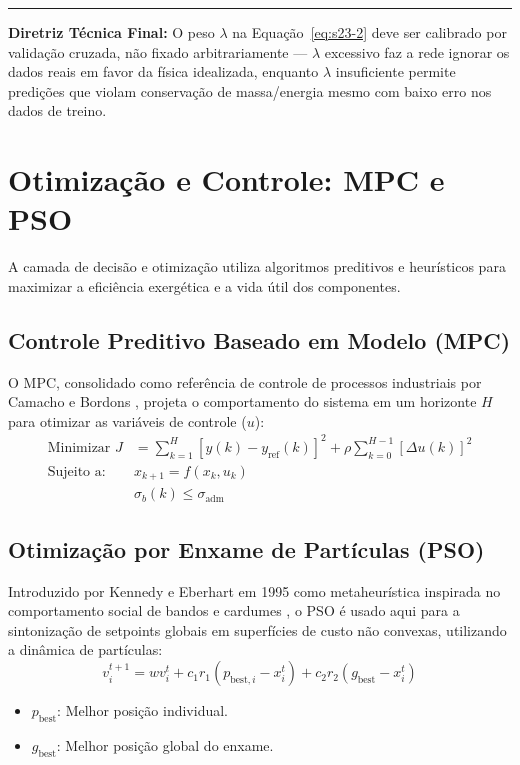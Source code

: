 \documentclass[12pt,a4paper]{article}
\numberwithin{equation}{section}
\numberwithin{table}{section}
\numberwithin{figure}{section}
\begin{document}
	\vspace{1em}
	\hrule
	\vspace{1em}

	\textbf{Diretriz Técnica Final:} O peso $\lambda$ na Equação~\eqref{eq:s23-2} deve ser calibrado por validação cruzada, não fixado arbitrariamente — $\lambda$ excessivo faz a rede ignorar os dados reais em favor da física idealizada, enquanto $\lambda$ insuficiente permite predições que violam conservação de massa/energia mesmo com baixo erro nos dados de treino.

	\section{Otimização e Controle: MPC e PSO}
	
	A camada de decisão e otimização utiliza algoritmos preditivos e heurísticos para maximizar a eficiência exergética e a vida útil dos componentes.
	
	\subsection{Controle Preditivo Baseado em Modelo (MPC)}
	O MPC, consolidado como referência de controle de processos industriais por Camacho e Bordons \cite{mpc}, projeta o comportamento do sistema em um horizonte $H$ para otimizar as variáveis de controle ($u$):
	\begin{equation}\label{eq:s24-1}
	\begin{aligned}
		\text{Minimizar } J &= \sum_{k=1}^{H} [ y(k) - y_{\text{ref}}(k) ]^2 + \rho \sum_{k=0}^{H-1} [ \Delta u(k) ]^2 \\[4pt]
		\text{Sujeito a: } & x_{k+1} = f(x_k, u_k) \\
		& \sigma_b(k) \le \sigma_{\text{adm}}
	\end{aligned}
\end{equation}
	
	\subsection{Otimização por Enxame de Partículas (PSO)}
	Introduzido por Kennedy e Eberhart em 1995 como metaheurística inspirada no comportamento social de bandos e cardumes \cite{pso}, o PSO é usado aqui para a sintonização de setpoints globais em superfícies de custo não convexas, utilizando a dinâmica de partículas:
	\begin{equation}\label{eq:s24-2}
 v_{i}^{t+1} = w v_{i}^t + c_1 r_1 (p_{\text{best},i} - x_{i}^t) + c_2 r_2 (g_{\text{best}} - x_{i}^t) 
\end{equation}
	\begin{itemize}
		\item $p_{\text{best}}$: Melhor posição individual.
		\item $g_{\text{best}}$: Melhor posição global do enxame.
	\end{itemize}
\end{document}
